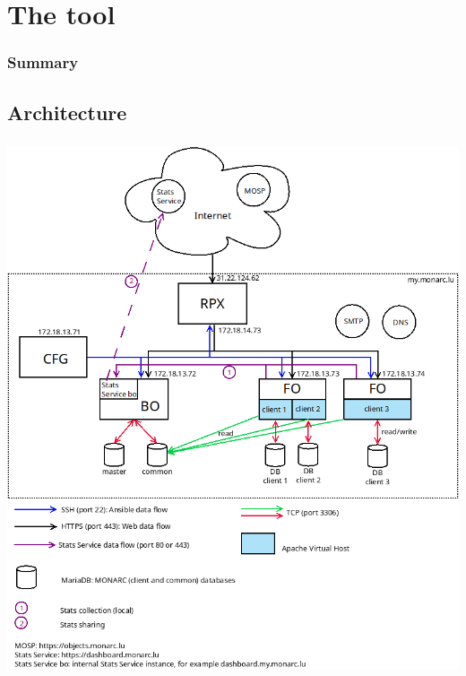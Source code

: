 %
%
\section{The tool}
\begin{frame}
    \frametitle{Summary}
\end{frame}
\subsection{Architecture}
\begin{frame}
    \frametitle{}
    \framesubtitle{}
    \begin{center}
        \includegraphics[scale=0.26]{pictures/monarc-architecture.png}
    \end{center}
\end{frame}



